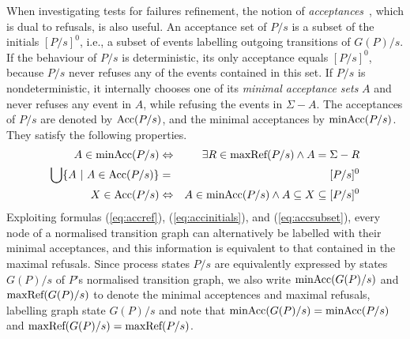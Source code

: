 When investigating  tests for failures refinement, the notion of
\emph{acceptances}~\cite{Hennessy:1988:ATP:50497}, which is dual to refusals,
is also useful. An acceptance set of $P/s$ is a subset of the initials
$[P/s]^0$, i.e., a subset of events labelling  outgoing transitions of
$G(P)/s$. If the behaviour of  $P/s$ is deterministic, its only acceptance
equals $[P/s]^0$, because $P/s$ never refuses any of the events contained in
this set. If $P/s$ is nondeterministic, it internally chooses one of its
\emph{minimal acceptance sets} $A$ and never refuses any event in $A$, while
refusing the events in $\Sigma-A$. The acceptances of $P/s$ are denoted by
$\text{Acc}(P/s)$, and the minimal acceptances by $\text{minAcc}(P/s)$. They satisfy
the following properties.
%
\begin{eqnarray}
A\in \text{minAcc}(P/s) & \Leftrightarrow & \exists R\in\text{maxRef}(P/s) \wedge A = \Sigma-R
\label{eq:accref}
\\
\bigcup \{ A~|~A\in \text{Acc}(P/s)\} & = & [P/s]^0
\label{eq:accinitials}
\\
 X\in\text{Acc}(P/s) &\Leftrightarrow & A\in \text{minAcc}(P/s) \wedge A\subseteq X \subseteq [P/s]^0
 \label{eq:accsubset}
\end{eqnarray}
%
%
Exploiting formulas (\ref{eq:accref}), (\ref{eq:accinitials}), and
(\ref{eq:accsubset}), every node of a normalised transition graph can
alternatively be labelled with their minimal acceptances, and this
information is equivalent to that contained in the maximal refusals. Since
process states $P/s$ are equivalently expressed by states $G(P)/s$ of $P$'s
normalised transition graph, we also write $\text{minAcc}(G(P)/s)$ and
$\text{maxRef}(G(P)/s)$ to denote the minimal acceptences and maximal refusals,
labelling graph state $G(P)/s$ and note that $\text{minAcc}(G(P)/s) =
\text{minAcc}(P/s)$ and $\text{maxRef}(G(P)/s) = \text{maxRef}(P/s)$.

